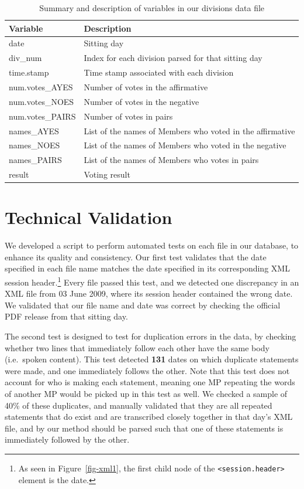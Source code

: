 \documentclass[
  letterpaper,
  DIV=11,
  numbers=noendperiod]{scrartcl}
\begin{document}
\hypertarget{tbl-divisions}{}
\begin{table}[H]
\caption{\label{tbl-divisions}Summary and description of variables in our divisions data file }\tabularnewline

\centering
\begin{tabular}{ll}
\toprule
Variable & Description\\
\midrule
date & Sitting day\\
div\_num & Index for each division parsed for that sitting day\\
time.stamp & Time stamp associated with each division\\
num.votes\_AYES & Number of votes in the affirmative\\
num.votes\_NOES & Number of votes in the negative\\
\addlinespace
num.votes\_PAIRS & Number of votes in pairs\\
names\_AYES & List of the names of Members who voted in the affirmative\\
names\_NOES & List of the names of Members who voted in the negative\\
names\_PAIRS & List of the names of Members who votes in pairs\\
result & Voting result\\
\bottomrule
\end{tabular}
\end{table}

\hypertarget{technical-validation}{%
\section{Technical Validation}\label{technical-validation}}

We developed a script to perform automated tests on each file in our
database, to enhance its quality and consistency. Our first test
validates that the date specified in each file name matches the date
specified in its corresponding XML session header.\footnote{As seen in
  Figure~\ref{fig-xml1}, the first child node of the
  \texttt{\textless{}session.header\textgreater{}} element is the date.}
Every file passed this test, and we detected one discrepancy in an XML
file from 03 June 2009, where its session header contained the wrong
date. We validated that our file name and date was correct by checking
the official PDF release from that sitting day.

The second test is designed to test for duplication errors in the data,
by checking whether two lines that immediately follow each other have
the same body (i.e.~spoken content). This test detected \textbf{131}
dates on which duplicate statements were made, and one immediately
follows the other. Note that this test does not account for who is
making each statement, meaning one MP repeating the words of another MP
would be picked up in this test as well. We checked a sample of 40\% of
these duplicates, and manually validated that they are all repeated
statements that do exist and are transcribed closely together in that
day's XML file, and by our method should be parsed such that one of
these statements is immediately followed by the other.
\end{document}
